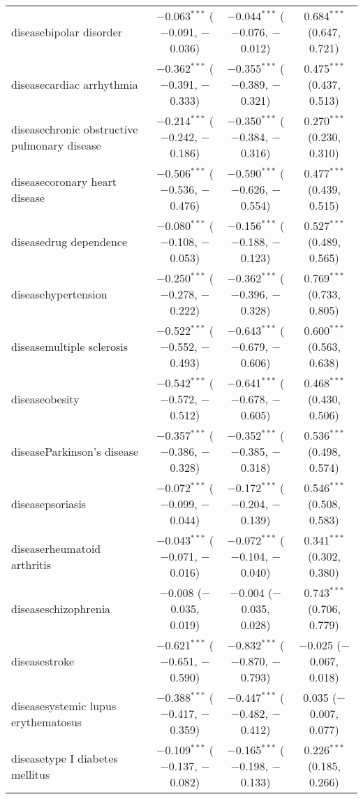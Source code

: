 \begin{table}[!htbp]
\begin{tabular}{@{\extracolsep{5pt}}lccc}
  diseasebipolar disorder & $-$0.063$^{***}$ ($-$0.091, $-$0.036) & $-$0.044$^{***}$ ($-$0.076, $-$0.012) & 0.684$^{***}$ (0.647, 0.721) \\ 
  diseasecardiac arrhythmia & $-$0.362$^{***}$ ($-$0.391, $-$0.333) & $-$0.355$^{***}$ ($-$0.389, $-$0.321) & 0.475$^{***}$ (0.437, 0.513) \\ 
  diseasechronic obstructive pulmonary disease & $-$0.214$^{***}$ ($-$0.242, $-$0.186) & $-$0.350$^{***}$ ($-$0.384, $-$0.316) & 0.270$^{***}$ (0.230, 0.310) \\ 
  diseasecoronary heart disease & $-$0.506$^{***}$ ($-$0.536, $-$0.476) & $-$0.590$^{***}$ ($-$0.626, $-$0.554) & 0.477$^{***}$ (0.439, 0.515) \\ 
  diseasedrug dependence & $-$0.080$^{***}$ ($-$0.108, $-$0.053) & $-$0.156$^{***}$ ($-$0.188, $-$0.123) & 0.527$^{***}$ (0.489, 0.565) \\ 
  diseasehypertension & $-$0.250$^{***}$ ($-$0.278, $-$0.222) & $-$0.362$^{***}$ ($-$0.396, $-$0.328) & 0.769$^{***}$ (0.733, 0.805) \\ 
  diseasemultiple sclerosis & $-$0.522$^{***}$ ($-$0.552, $-$0.493) & $-$0.643$^{***}$ ($-$0.679, $-$0.606) & 0.600$^{***}$ (0.563, 0.638) \\ 
  diseaseobesity & $-$0.542$^{***}$ ($-$0.572, $-$0.512) & $-$0.641$^{***}$ ($-$0.678, $-$0.605) & 0.468$^{***}$ (0.430, 0.506) \\ 
  diseaseParkinson's disease & $-$0.357$^{***}$ ($-$0.386, $-$0.328) & $-$0.352$^{***}$ ($-$0.385, $-$0.318) & 0.536$^{***}$ (0.498, 0.574) \\ 
  diseasepsoriasis & $-$0.072$^{***}$ ($-$0.099, $-$0.044) & $-$0.172$^{***}$ ($-$0.204, $-$0.139) & 0.546$^{***}$ (0.508, 0.583) \\ 
  diseaserheumatoid arthritis & $-$0.043$^{***}$ ($-$0.071, $-$0.016) & $-$0.072$^{***}$ ($-$0.104, $-$0.040) & 0.341$^{***}$ (0.302, 0.380) \\ 
  diseaseschizophrenia & $-$0.008 ($-$0.035, 0.019) & $-$0.004 ($-$0.035, 0.028) & 0.743$^{***}$ (0.706, 0.779) \\ 
  diseasestroke & $-$0.621$^{***}$ ($-$0.651, $-$0.590) & $-$0.832$^{***}$ ($-$0.870, $-$0.793) & $-$0.025 ($-$0.067, 0.018) \\ 
  diseasesystemic lupus erythematosus & $-$0.388$^{***}$ ($-$0.417, $-$0.359) & $-$0.447$^{***}$ ($-$0.482, $-$0.412) & 0.035 ($-$0.007, 0.077) \\ 
  diseasetype I diabetes mellitus & $-$0.109$^{***}$ ($-$0.137, $-$0.082) & $-$0.165$^{***}$ ($-$0.198, $-$0.133) & 0.226$^{***}$ (0.185, 0.266) \\ 

\end{tabular}
\end{table}
